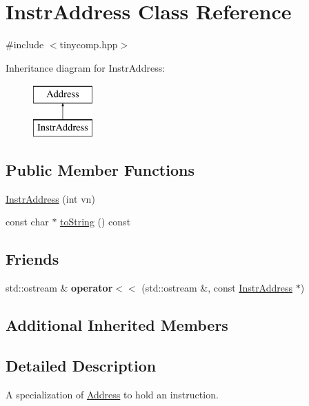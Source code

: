 \hypertarget{class_instr_address}{}\section{Instr\+Address Class Reference}
\label{class_instr_address}


{\ttfamily \#include $<$tinycomp.\+hpp$>$}

Inheritance diagram for Instr\+Address\+:\begin{figure}[H]
\begin{center}
\leavevmode
\includegraphics[height=2.000000cm]{class_instr_address}
\end{center}
\end{figure}
\subsection*{Public Member Functions}
\begin{DoxyCompactItemize}
\item 
\hyperlink{class_instr_address_a966c221ee738631ef72bdf7d2bcb2771}{Instr\+Address} (int vn)
\item 
const char $\ast$ \hyperlink{class_instr_address_a4cf3f82f491d6bc401008d93ced13b17}{to\+String} () const 
\end{DoxyCompactItemize}
\subsection*{Friends}
\begin{DoxyCompactItemize}
\item 
std\+::ostream \& {\bfseries operator$<$$<$} (std\+::ostream \&, const \hyperlink{class_instr_address}{Instr\+Address} $\ast$)\hypertarget{class_instr_address_aa218b6426f449d15a282b4ba5d3c07c3}{}\label{class_instr_address_aa218b6426f449d15a282b4ba5d3c07c3}

\end{DoxyCompactItemize}
\subsection*{Additional Inherited Members}


\subsection{Detailed Description}
A specialization of \hyperlink{class_address}{Address} to hold an instruction. 

